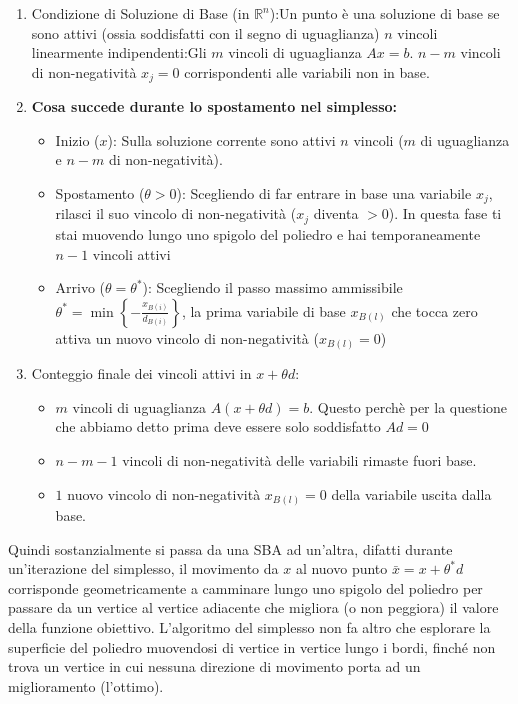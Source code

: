 \begin{enumerate}
    \item Condizione di Soluzione di Base (in $\mathbb{R}^n$):Un punto è una soluzione di base se sono attivi (ossia soddisfatti con il segno di uguaglianza) $n$ vincoli linearmente indipendenti:Gli $m$ vincoli di uguaglianza $Ax = b$.   $n - m$ vincoli di non-negatività $x_j = 0$ corrispondenti alle variabili non in base.
    \item \textbf{Cosa succede durante lo spostamento nel simplesso:}
    \begin{itemize}
        \item  Inizio ($x$): Sulla soluzione corrente sono attivi $n$ vincoli ($m$ di uguaglianza e $n-m$ di non-negatività).
        \item  Spostamento ($\theta > 0$): Scegliendo di far entrare in base una variabile $x_j$, rilasci il suo vincolo di non-negatività ($x_j$ diventa $>0$).  In questa fase ti stai muovendo lungo uno spigolo del poliedro e hai temporaneamente $n-1$ vincoli attivi
        \item  Arrivo ($\theta = \theta^*$): Scegliendo il passo massimo ammissibile $\theta^* = \min \left\{ -\frac{x_{B(i)}}{d_{B(i)}} \right\}$, la prima variabile di base $x_{B(l)}$ che tocca zero attiva un nuovo vincolo di non-negatività ($x_{B(l)} = 0$)
    \end{itemize}
    \item Conteggio finale dei vincoli attivi in $x + \theta d$: 
    \begin{itemize}
        \item  $m$ vincoli di uguaglianza $A (x + \theta d) = b$. Questo perchè per la questione che abbiamo detto prima deve essere solo soddisfatto $Ad = 0$   
        \item $n - m - 1$ vincoli di non-negatività delle variabili rimaste fuori base.
        \item $1$ nuovo vincolo di non-negatività $x_{B(l)} = 0$ della variabile uscita dalla base.
    \end{itemize}
\end{enumerate}
Quindi sostanzialmente si passa da una SBA ad un'altra, difatti durante un'iterazione del simplesso, il movimento da $x$ al nuovo punto $\bar{x} = x + \theta^* d$ corrisponde geometricamente a camminare lungo uno spigolo del poliedro per passare da un vertice al vertice adiacente che migliora (o non peggiora) il valore della funzione obiettivo. 
L'algoritmo del simplesso non fa altro che esplorare la superficie del poliedro muovendosi di vertice in vertice lungo i bordi, finché non trova un vertice in cui nessuna direzione di movimento porta ad un miglioramento (l'ottimo).

